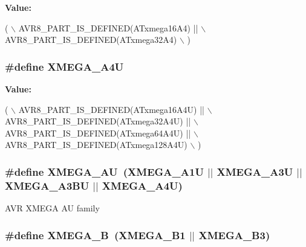 {\bfseries Value\-:}
\begin{DoxyCode}
( \(\backslash\)
                AVR8\_PART\_IS\_DEFINED(ATxmega16A4) || \(\backslash\)
                AVR8\_PART\_IS\_DEFINED(ATxmega32A4) \(\backslash\)
                )
\end{DoxyCode}
\hypertarget{group__xmega__part__macros__group_ga7625edcdd219df905c870d73c1689da6}{
\subsubsection[{X\-M\-E\-G\-A\-\_\-\-A4\-U}]{\setlength{\rightskip}{0pt plus 5cm}\#define X\-M\-E\-G\-A\-\_\-\-A4\-U}}\label{group__xmega__part__macros__group_ga7625edcdd219df905c870d73c1689da6}
{\bfseries Value\-:}
\begin{DoxyCode}
( \(\backslash\)
                AVR8\_PART\_IS\_DEFINED(ATxmega16A4U)  || \(\backslash\)
                AVR8\_PART\_IS\_DEFINED(ATxmega32A4U)  || \(\backslash\)
                AVR8\_PART\_IS\_DEFINED(ATxmega64A4U)  || \(\backslash\)
                AVR8\_PART\_IS\_DEFINED(ATxmega128A4U) \(\backslash\)
                )
\end{DoxyCode}
\hypertarget{group__xmega__part__macros__group_ga55210f3805902072fce76647b50fa177}{
\subsubsection[{X\-M\-E\-G\-A\-\_\-\-A\-U}]{\setlength{\rightskip}{0pt plus 5cm}\#define X\-M\-E\-G\-A\-\_\-\-A\-U~(X\-M\-E\-G\-A\-\_\-\-A1\-U $|$$|$ X\-M\-E\-G\-A\-\_\-\-A3\-U $|$$|$ X\-M\-E\-G\-A\-\_\-\-A3\-B\-U $|$$|$ X\-M\-E\-G\-A\-\_\-\-A4\-U)}}\label{group__xmega__part__macros__group_ga55210f3805902072fce76647b50fa177}
A\-V\-R X\-M\-E\-G\-A A\-U family \hypertarget{group__xmega__part__macros__group_ga62f2c1c93640237425cb64186ddce219}{
\subsubsection[{X\-M\-E\-G\-A\-\_\-\-B}]{\setlength{\rightskip}{0pt plus 5cm}\#define X\-M\-E\-G\-A\-\_\-\-B~(X\-M\-E\-G\-A\-\_\-\-B1 $|$$|$ X\-M\-E\-G\-A\-\_\-\-B3)}}\label{group__xmega__part__macros__group_ga62f2c1c93640237425cb64186ddce219}
